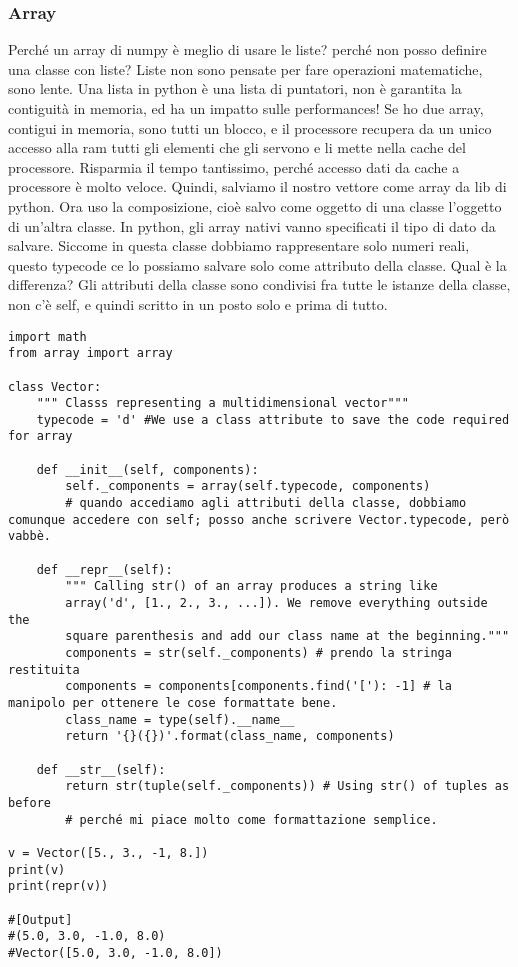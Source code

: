 \documentclass[10pt, a4paper, titlepage]{book}
\begin{document}
\subsubsection{Array}

Perché un array di numpy è meglio di usare le liste? perché non posso definire una classe con liste? Liste non sono pensate per fare operazioni matematiche, sono lente.
Una lista in python è una lista di puntatori, non è garantita la contiguità in memoria, ed ha un impatto sulle performances!
Se ho due array, contigui in memoria, sono tutti un blocco, e il processore recupera da un unico accesso alla ram tutti gli elementi che gli servono e li mette nella cache del processore.
Risparmia il tempo tantissimo, perché accesso dati da cache a processore è molto veloce.
Quindi, salviamo il nostro vettore come array da lib di python. 
Ora uso la composizione, cioè salvo come oggetto di una classe l'oggetto di un'altra classe.
In python, gli array nativi vanno specificati il tipo di dato da salvare.
Siccome in questa classe dobbiamo rappresentare solo numeri reali, questo typecode ce lo possiamo salvare solo come attributo della classe.
Qual è la differenza? 
Gli attributi della classe sono condivisi fra tutte le istanze della classe, non c'è self, e quindi scritto in un posto solo e prima di tutto.

\begin{verbatim}
import math
from array import array

class Vector:
	""" Classs representing a multidimensional vector"""
	typecode = 'd' #We use a class attribute to save the code required for array

	def __init__(self, components):
		self._components = array(self.typecode, components)
		# quando accediamo agli attributi della classe, dobbiamo comunque accedere con self; posso anche scrivere Vector.typecode, però vabbè.

	def __repr__(self):
		""" Calling str() of an array produces a string like
		array('d', [1., 2., 3., ...]). We remove everything outside the
		square parenthesis and add our class name at the beginning."""
		components = str(self._components) # prendo la stringa restituita
		components = components[components.find('['): -1] # la manipolo per ottenere le cose formattate bene.
		class_name = type(self).__name__
		return '{}({})'.format(class_name, components)

	def __str__(self):
		return str(tuple(self._components)) # Using str() of tuples as before
		# perché mi piace molto come formattazione semplice.

v = Vector([5., 3., -1, 8.])
print(v)
print(repr(v))

#[Output]
#(5.0, 3.0, -1.0, 8.0)
#Vector([5.0, 3.0, -1.0, 8.0])	
\end{verbatim}
\end{document}
